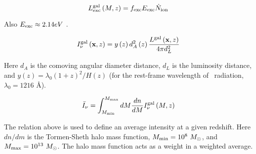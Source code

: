 \begin{equation}
  L_{\rm exc}^{\rm gal} \left( M, z\right) = f_{\rm exc} E_{\rm exc} \dot{N}_{\rm ion}
\end{equation}

Also $E_{\rm exc} \approx 2.14 eV$ \cite{1996ApJ...468..462G} \cite{2005MNRAS.362..799M}.

\begin{equation}
  I_{\nu}^{\rm gal}\left(\textbf{x}, z \right) = y \left(z \right)d_A^2 \left(z \right) \frac{L^{\rm gal} \left(\textbf{x}, z \right)}{4 \pi d_L^2}
\end{equation}

Here $d_A$ is the comoving angular diameter distance, $d_L$ is the luminosity distance, and
$y \left( z \right) = \lambda_{0} \left( 1 + z\right)^2 / H \left(z \right)$ (for the rest-frame
wavelength of \lya\ radiation, $\lambda_0 = 1216$ \AA).

\begin{equation}
  \bar{I}_{\nu} = \int_{M_{\rm min}}^{M_{\rm max}} dM \frac{dn}{dM} I^{\rm gal}_{\nu} \left(M, z \right)
\end{equation}

The relation above is used to define an average intensity at a given redshift. Here $dn/dm$ is the
Tormen-Sheth halo mass function, $M_{\rm min} = 10^{8} \ M_{\odot}$, and $M_{\rm max} = 10^{13} \ M_{\odot}$.
The halo mass function acts as a weight in a weighted average.
